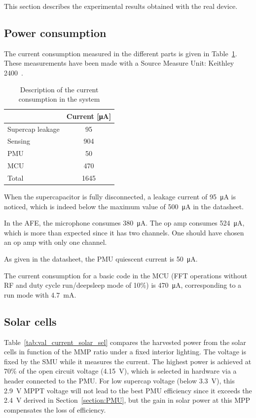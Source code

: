 \documentclass{EPL-master-thesis-covers-EN}
\begin{document}
This section describes the experimental results obtained with the real device.

\subsection*{Power consumption}

The current consumption measured in the different parts is given in Table~\ref{tab:val_current_cons}. These measurements have been made with a Source Measure Unit: Keithley 2400~\cite{Keithley}.

\begin{table}[H]
\centering
\begin{tabular}{lc}
\toprule
                     & Current [\si{\micro A}]  \\ \midrule
 Supercap leakage    & 95                       \\
 Sensing             & 904                     \\
 PMU                 & 50                       \\
 MCU                 & 470                      \\ \midrule
 Total               & 1645                     \\ \bottomrule
\end{tabular}
\caption{Description of the current consumption in the system}
\label{tab:val_current_cons}
\end{table}

When the supercapacitor is fully disconnected, a leakage current of \SI{95}{\micro A} is noticed, which is indeed below the maximum value of \SI{500}{\micro A} in the datasheet.

In the AFE, the microphone consumes \SI{380}{\micro A}. The op amp consumes \SI{524}{\micro A}, which is more than expected since it has two channels. One should have chosen an op amp with only one channel.

As given in the datasheet, the PMU quiescent current is \SI{50}{\micro A}.

The current consumption for a basic code in the MCU (FFT operations without RF and  duty cycle run/deepsleep mode of 10\%) is \SI{470}{\micro A}, corresponding to a run mode with \SI{4.7}{mA}.

\subsection*{Solar cells}

Table~\ref{tab:val_current_solar_sel} compares the harvested power from the solar cells in function of the MMP ratio under a fixed interior lighting. The voltage is fixed by the SMU while it measures the current. The highest power is achieved at 70\% of the open circuit voltage (\SI{4.15}{V}), which is selected in hardware via a header connected to the PMU. For low supercap voltage (below \SI{3.3}{V}), this \SI{2.9}{V} MPPT voltage will not lead to the best PMU efficiency since it exceeds the \SI{2.4}{V} derived in Section~\ref{section:PMU}, but the gain in solar power at this MPP compensates the loss of efficiency.
\end{document}
